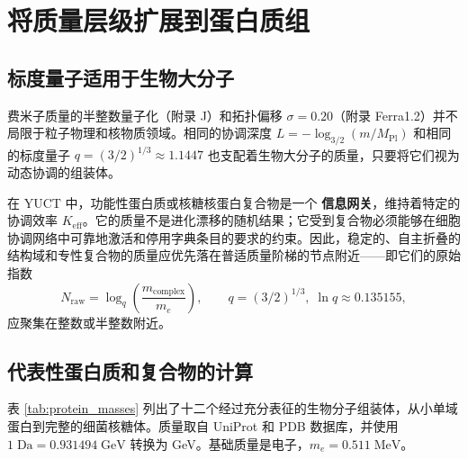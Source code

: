 \documentclass[12pt,a4paper,fontset=fandol]{ctexart}
\begin{document}
	\section{将质量层级扩展到蛋白质组}
	\label{sec:protein_hierarchy}
	
	\subsection{标度量子适用于生物大分子}
	
	费米子质量的半整数量子化（附录 J）和拓扑偏移 \(\sigma = 0.20\)（附录 Ferra1.2）并不局限于粒子物理和核物质领域。相同的协调深度 \(L = -\log_{3/2}(m/M_{\mathrm{Pl}})\) 和相同的标度量子 \(q = (3/2)^{1/3} \approx 1.1447\) 也支配着生物大分子的质量，只要将它们视为动态协调的组装体。
	
	在 YUCT 中，功能性蛋白质或核糖核蛋白复合物是一个 \textbf{信息网关}，维持着特定的协调效率 \(K_{\mathrm{eff}}\)。它的质量不是进化漂移的随机结果；它受到复合物必须能够在细胞协调网络中可靠地激活和停用字典条目的要求的约束。因此，稳定的、自主折叠的结构域和专性复合物的质量应优先落在普适质量阶梯的节点附近——即它们的原始指数
	\[
	N_{\mathrm{raw}} = \log_q\!\left(\frac{m_{\mathrm{complex}}}{m_e}\right),
	\qquad q = (3/2)^{1/3},\; \ln q \approx 0.135155,
	\]
	应聚集在整数或半整数附近。
	
	\subsection{代表性蛋白质和复合物的计算}
	
	表 \ref{tab:protein_masses} 列出了十二个经过充分表征的生物分子组装体，从小单域蛋白到完整的细菌核糖体。质量取自 UniProt 和 PDB 数据库，并使用 \(1\;\text{Da} = 0.931494\;\text{GeV}\) 转换为 GeV。基础质量是电子，\(m_e = 0.511\;\text{MeV}\)。
	
\end{document}
